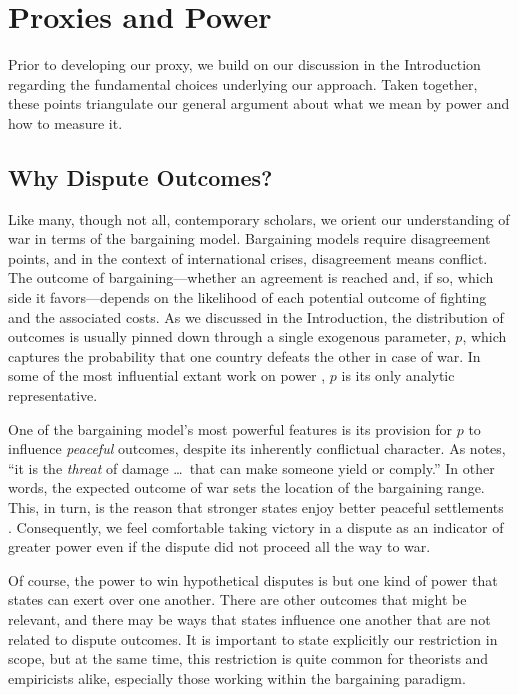 
\section{Proxies and Power}
\label{sec:proxies-power}

Prior to developing our proxy, we build on our discussion in the Introduction regarding the fundamental choices underlying our approach.
Taken together, these points triangulate our general argument about what we mean by power and how to measure it.

\subsection{Why Dispute Outcomes?}

Like many, though not all, contemporary scholars, we orient our understanding of war in terms of the bargaining model.
Bargaining models require disagreement points, and in the context of international crises, disagreement means conflict.
The outcome of bargaining---whether an agreement is reached and, if so, which side it favors---depends on the likelihood of each potential outcome of fighting and the associated costs.
As we discussed in the Introduction, the distribution of outcomes is usually pinned down through a single exogenous parameter, $p$, which captures the probability that one country defeats the other in case of war.
In some of the most influential extant work on power \citep[e.g.,][]{powell1999}, $p$ is its only analytic representative.

One of the bargaining model's most powerful features is its provision for $p$ to influence \emph{peaceful} outcomes, despite its inherently conflictual character.
As \citet[3]{schellingpower} notes, ``it is the \emph{threat} of damage \ldots\ that can make someone yield or comply.''
In other words, the expected outcome of war sets the location of the bargaining range.
This, in turn, is the reason that stronger states enjoy better peaceful settlements \citep{banks1990equilibrium}.
Consequently, we feel comfortable taking victory in a dispute as an indicator of greater power even if the dispute did not proceed all the way to war.

Of course, the power to win hypothetical disputes is but one kind of power that states can exert over one another.
There are other outcomes that might be relevant, and there may be ways that states influence one another that are not related to dispute outcomes.
It is important to state explicitly our restriction in scope, but at the same time, this restriction is quite common for theorists and empiricists alike, especially those working within the bargaining paradigm.


